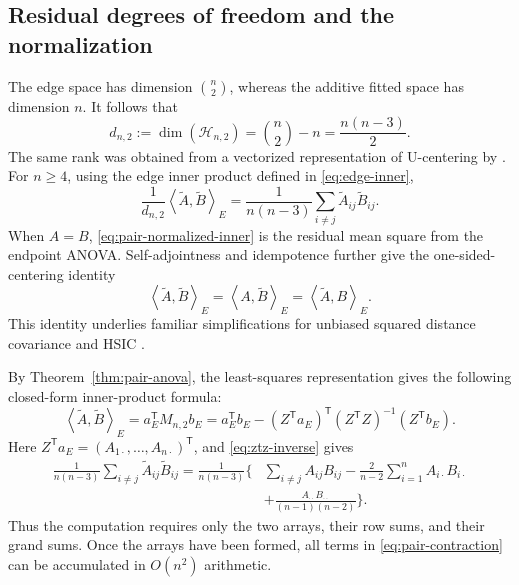 \documentclass[11pt]{article}
\theoremstyle{plain}
\theoremstyle{definition}
\theoremstyle{remark}
\newcommand{\cH}{\mathcal H}
\newcommand{\inner}[2]{\left\langle #1,#2\right\rangle}
\begin{document}
\subsection{Residual degrees of freedom and the normalization}
The edge space has dimension $\binom n2$, whereas the additive fitted space
has dimension $n$.  It follows that
  \begin{equation*}
 d_{n,2}:=\dim(\cH_{n,2})
 =\binom n2-n
 =\frac{n(n-3)}{2}.
\end{equation*}
The same rank was obtained from a vectorized representation of U-centering by
\citet{ZhuZhangYaoShao2020}.  For $n\ge4$, using the edge inner product defined in
\eqref{eq:edge-inner},
\begin{equation}\label{eq:pair-normalized-inner}
 \frac{1}{d_{n,2}}\inner{\widetilde A}{\widetilde B}_E
 =\frac{1}{n(n-3)}\sum_{i\ne j}\widetilde A_{ij}\widetilde B_{ij}.
\end{equation}
When $A=B$, \eqref{eq:pair-normalized-inner} is the residual mean square from
the endpoint ANOVA\@.  Self-adjointness and idempotence further give the
one-sided-centering identity
  \begin{equation*}
 \inner{\widetilde A}{\widetilde B}_E
 =\inner{A}{\widetilde B}_E
 =\inner{\widetilde A}{B}_E.
\end{equation*}
This identity underlies familiar simplifications for unbiased squared distance
covariance and HSIC \citep{SzekelyRizzo2014,SongEtAl2012}.

By Theorem~\ref{thm:pair-anova}, the least-squares representation gives the
following closed-form inner-product formula:
\[
 \inner{\widetilde A}{\widetilde B}_E
 =a_E^\mathsf TM_{n,2}b_E
 =a_E^\mathsf Tb_E
 -(Z^\mathsf Ta_E)^\mathsf T
   (Z^\mathsf TZ)^{-1}(Z^\mathsf Tb_E).
\]
Here $Z^\mathsf Ta_E=(A_{1\cdot},\ldots,A_{n\cdot})^\mathsf T$, and
\eqref{eq:ztz-inverse} gives
\begin{equation}\label{eq:pair-contraction}
\begin{split}
 \frac{1}{n(n-3)}\sum_{i\ne j}\widetilde A_{ij}\widetilde B_{ij}
 =\frac{1}{n(n-3)}\bigg\{&
 \sum_{i\ne j}A_{ij}B_{ij}
 -\frac{2}{n-2}\sum_{i=1}^n A_{i\cdot}B_{i\cdot}\\
 &+\frac{A_{\cdot\cdot}B_{\cdot\cdot}}{(n-1)(n-2)}\bigg\}.
\end{split}
\end{equation}
Thus the computation requires only the two arrays, their row sums, and their
grand sums.  Once the arrays have been formed, all terms in
\eqref{eq:pair-contraction} can be accumulated in $O(n^2)$ arithmetic.
\end{document}
